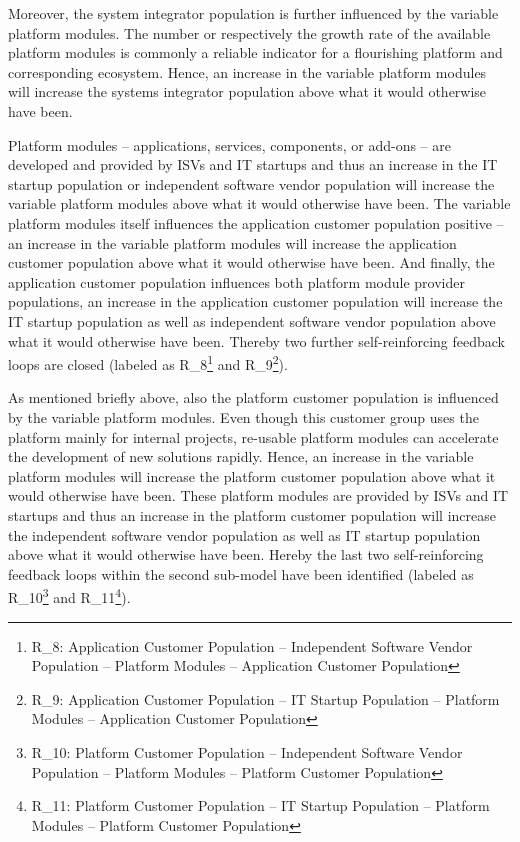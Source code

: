 Moreover, the system integrator population is further influenced by the variable platform modules. The number or respectively the growth rate of the available platform modules is commonly a reliable indicator for a flourishing platform and corresponding ecosystem. Hence, an increase in the variable platform modules will increase the systems integrator population above what it would otherwise have been.

Platform modules -- applications, services, components, or add-ons -- are developed and provided by \acp{ISV} and \ac{IT} startups and thus an increase in the \ac{IT} startup population or independent software vendor population will increase the variable platform modules above what it would otherwise have been. The variable platform modules itself influences the application customer population positive -- an increase in the variable platform modules will increase the application customer population above what it would otherwise have been. And finally, the application customer population influences both platform module provider populations, an increase in the application customer population will increase the \ac{IT} startup population as well as independent software vendor population above what it would otherwise have been. Thereby two further self-reinforcing feedback loops are closed (labeled as R\_8\footnote{R\_8: Application Customer Population -- Independent Software Vendor Population -- Platform Modules -- Application Customer Population} and R\_9\footnote{R\_9: Application Customer Population -- \ac{IT} Startup Population -- Platform Modules -- Application Customer Population}).

As mentioned briefly above, also the platform customer population is influenced by the variable platform modules. Even though this customer group uses the platform mainly for internal projects, re-usable platform modules can accelerate the development of new solutions rapidly. Hence, an increase in the variable platform modules will increase the platform customer population above what it would otherwise have been. These platform modules are provided by \acp{ISV} and \ac{IT} startups and thus an increase in the platform customer population will increase the independent software vendor population as well as \ac{IT} startup population above what it would otherwise have been. Hereby the last two self-reinforcing feedback loops within the second sub-model have been identified (labeled as R\_10\footnote{R\_10: Platform Customer Population -- Independent Software Vendor Population -- Platform Modules -- Platform Customer Population} and R\_11\footnote{R\_11: Platform Customer Population -- \ac{IT} Startup Population -- Platform Modules -- Platform Customer Population}).

